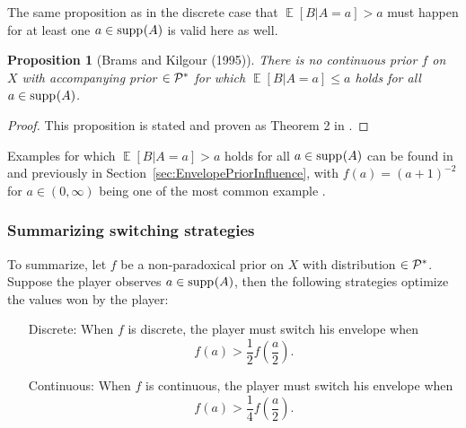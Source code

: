 \documentclass[a4paper]{report}
\theoremstyle{plain}
\newtheorem{proposition}[theorem]{Proposition}
\theoremstyle{definition}
\theoremstyle{remark}
\numberwithin{equation}{chapter}
\let\P\relax
\DeclareMathOperator{\P}{\mathbb{P}}
\DeclareMathOperator{\E}{\mathbb{E}}
\DeclareMathOperator{\1}{\mathbbm{1}}
\DeclareMathOperator{\supp}{supp}
\newcommand{\Pmod}{\mathcal{P}^*}
\begin{document}
The same proposition as in the discrete case that $\E[B|A=a]>a$ must happen for at least one $a\in\supp_{\P}(A)$ is valid here as well.
\begin{proposition}[Brams and Kilgour (1995)]
There is no continuous prior $f$ on $X$ with accompanying prior $\P\in\Pmod$ for which $\E[B|A=a]\leq a$ holds for all $a\in\supp_{\P}(A)$.
\end{proposition}
\begin{proof}
This proposition is stated and proven as Theorem 2 in \cite{Brams95}.
\end{proof}

Examples for which $\E[B|A=a]>a$ holds for all $a\in\supp_{\P}(A)$ can be found in \cite{Christensen96,Broome95,Brams95} and previously in Section~\ref{sec:EnvelopePriorInfluence}, with $f(a)=(a+1)^{-2}$ for $a\in(0,\infty)$ being one of the most common example \cite{Broome95}.

\subsubsection{Summarizing switching strategies}
To summarize, let $f$ be a non-paradoxical prior on $X$ with distribution $\P\in\Pmod$. Suppose the player observes $a\in\supp_{\P}(A)$, then the following strategies optimize the values won by the player:
\begin{itemize}
\item[Discrete:] When $f$ is discrete, the player must switch his envelope when \begin{equation}
f(a)>\frac{1}{2}f\left(\frac{a}{2}\right).
\end{equation}
\item[Continuous:] When $f$ is continuous, the player must switch his envelope when
\begin{equation}
f(a)>\frac{1}{4}f\left(\frac{a}{2}\right).
\end{equation}
\end{itemize}
\end{document}
